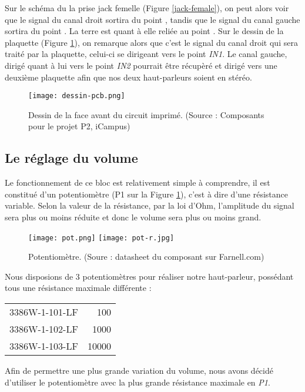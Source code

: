 Sur le schéma du la prise jack femelle (Figure \ref{jack-female}), on peut alors
voir que le signal du canal droit sortira du point , tandis que le signal du 
canal gauche sortira du point . La terre est quant à elle reliée au point
. Sur le dessin de la plaquette (Figure \ref{dessin-pcb}), on remarque alors
que c'est le signal du canal droit qui sera traité par la plaquette, celui-ci se dirigeant vers
le point \textit{IN1}. Le canal gauche, dirigé quant à lui vers le point \textit{IN2} pourrait
être récupèré et dirigé vers une deuxième plaquette afin que nos deux haut-parleurs soient en stéréo.

\begin{figure}[!hbt]
	\centering
	\texttt{[image: dessin-pcb.png]}
	\caption{Dessin de la face avant du circuit imprimé. (Source : Composants pour le projet P2, iCampus)}
	\label{dessin-pcb}
\end{figure}

\subsection{Le réglage du volume}
Le fonctionnement de ce bloc est relativement simple à comprendre, il est constitué d'un potentiomètre 
(P1 sur la Figure \ref{dessin-pcb}), c'est à dire d'une résistance variable.
Selon la valeur de la résistance, par la loi d'Ohm, l'amplitude du signal
sera plus ou moins réduite et donc le volume sera plus ou moins grand.

\begin{figure}[h]
	\centering
	\texttt{[image: pot.png]}
	\texttt{[image: pot-r.jpg]}
	\caption{Potentiomètre. (Soure : datasheet du composant sur Farnell.com)}
	\label{bloc2}
\end{figure}

Nous disposions de 3 potentiomètres pour réaliser notre haut-parleur, possédant
tous une résistance maximale différente :

\begin{center}
	\begin{tabular}{l|r}
	3386W-1-101-LF & \unit{100}{\ohm} \\
	3386W-1-102-LF & \unit{1000}{\ohm} \\
	3386W-1-103-LF & \unit{10000}{\ohm} 
	\end{tabular}
\end{center}

Afin de permettre une plus grande variation du volume, nous avons décidé d'utiliser
le potentiomètre avec la plus grande résistance maximale en \textit{P1}.

